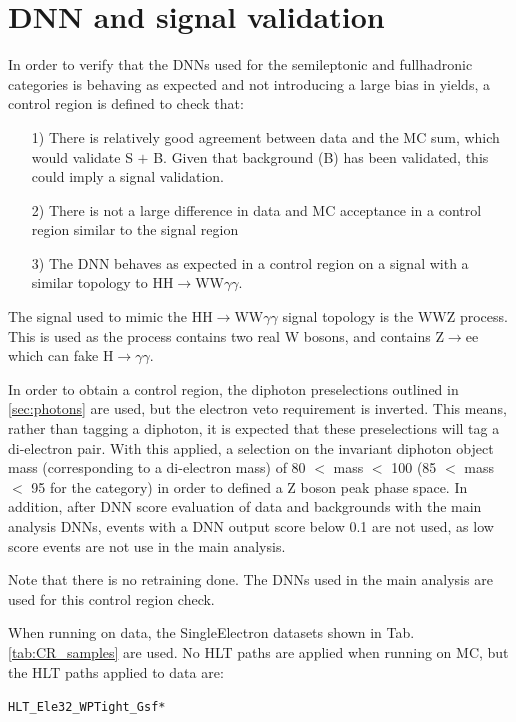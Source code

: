 \chapter{DNN and signal validation}
\label{sec:DNN_and_signal_validation}

In order to verify that the DNNs used for the semileptonic and fullhadronic categories is behaving as expected and not introducing a large bias in 
yields, a control region is defined to check that:

\begin{itemize}
    \item[1)] There is relatively good agreement between data and the MC sum, which would validate S $+$ B. Given that background (B) has been validated, this could imply a signal validation. 
    \item[2)] There is not a large difference in data and MC acceptance in a control region similar to the signal region 
    \item[3)] The DNN behaves as expected in a control region on a signal with a similar topology to HH$\rightarrow$WW$\gamma\gamma$. 
\end{itemize}

The signal used to mimic the HH$\rightarrow$WW$\gamma\gamma$ signal topology is the WWZ process. This is used as the process contains two real W bosons, 
and contains Z$\rightarrow$ee which can fake H$\rightarrow\gamma\gamma$. 

In order to obtain a control region, the diphoton preselections outlined in \ref{sec:photons} are used, but the electron veto requirement is inverted.
This means, rather than tagging a diphoton, it is expected that these preselections will tag a di-electron pair. With this applied, a selection on the 
invariant diphoton object mass (corresponding to a di-electron mass) of 80 $<$ mass $<$ 100 (85 $<$ mass $<$ 95 for the category) in order to defined a Z boson peak phase space. In addition, 
after DNN score evaluation of data and backgrounds with the main analysis DNNs, events with a DNN output score below 0.1 are not used, as low score 
events are not use in the main analysis. 

Note that there is no retraining done. The DNNs used in the main analysis are used for this control region check. 

When running on data, the SingleElectron datasets shown in Tab.\ref{tab:CR_samples} are used. No HLT paths are applied when running on MC, but the HLT 
paths applied to data are:\\
\begin{center}
        {\tt HLT\_Ele32\_WPTight\_Gsf*} \\
\end{center}

